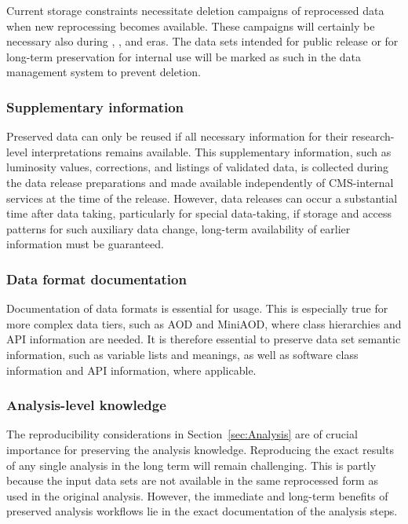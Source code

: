 Current storage constraints necessitate deletion campaigns of reprocessed data when new reprocessing becomes available. These campaigns will certainly be necessary also during \PhaseTwo, \RunFour, and \RunFive eras. The data sets intended for public release or for long-term preservation for internal use will be marked as such in the data management system to prevent deletion.

\subsubsection{Supplementary information}
\label{sec:pres-impl-suppl}

Preserved data can only be reused if all necessary information for their research-level interpretations remains available. This supplementary information, such as luminosity values, corrections, and listings of validated data, is collected during the data release preparations and made available independently of CMS-internal services at the time of the release. However, data releases can occur a substantial time after data taking, particularly for special data-taking, if storage and access patterns for such auxiliary data change, long-term availability of earlier information must be guaranteed.

\subsubsection{Data format documentation}
\label{sec:pres-impl-doc}

Documentation of data formats is essential for usage. This is especially true for more complex data tiers, such as AOD and MiniAOD, where class hierarchies and \gls{API} information are needed. It is therefore essential to preserve data set semantic information, such as variable lists and meanings, as well as software class information and \gls{API} information, where applicable.

\subsubsection{Analysis-level knowledge}
\label{sec:pres-impl-analysis}

The reproducibility considerations in Section~\ref{sec:Analysis} are of crucial importance for preserving the analysis knowledge. Reproducing the exact results of any single analysis in the long term will remain challenging. This is partly because the input data sets are not available in the same reprocessed form as used in the original analysis. However, the immediate and long-term benefits of preserved analysis workflows lie in the exact documentation of the analysis steps. 

